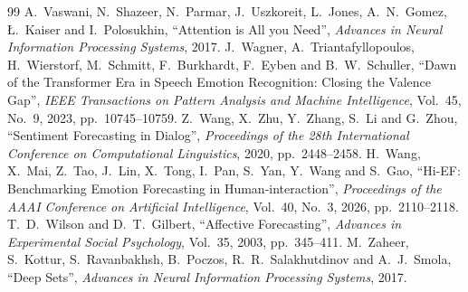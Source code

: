 \begin{thebibliography}{99}
 A.~Vaswani, N.~Shazeer, N.~Parmar, J.~Uszkoreit, L.~Jones, A.~N.~Gomez, {\L}.~Kaiser and I.~Polosukhin, ``Attention is All you Need'', \emph{Advances in Neural Information Processing Systems}, 2017.
 J.~Wagner, A.~Triantafyllopoulos, H.~Wierstorf, M.~Schmitt, F.~Burkhardt, F.~Eyben and B.~W.~Schuller, ``Dawn of the Transformer Era in Speech Emotion Recognition: Closing the Valence Gap'', \emph{IEEE Transactions on Pattern Analysis and Machine Intelligence}, Vol.~45, No.~9, 2023, pp.~10745--10759.
 Z.~Wang, X.~Zhu, Y.~Zhang, S.~Li and G.~Zhou, ``Sentiment Forecasting in Dialog'', \emph{Proceedings of the 28th International Conference on Computational Linguistics}, 2020, pp.~2448--2458.
 H.~Wang, X.~Mai, Z.~Tao, J.~Lin, X.~Tong, I.~Pan, S.~Yan, Y.~Wang and S.~Gao, ``{Hi-EF}: Benchmarking Emotion Forecasting in Human-interaction'', \emph{Proceedings of the AAAI Conference on Artificial Intelligence}, Vol.~40, No.~3, 2026, pp.~2110--2118.
 T.~D.~Wilson and D.~T.~Gilbert, ``Affective Forecasting'', \emph{Advances in Experimental Social Psychology}, Vol.~35, 2003, pp.~345--411.
 M.~Zaheer, S.~Kottur, S.~Ravanbakhsh, B.~Poczos, R.~R.~Salakhutdinov and A.~J.~Smola, ``Deep Sets'', \emph{Advances in Neural Information Processing Systems}, 2017.
\end{thebibliography}
